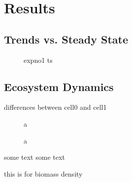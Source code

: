\chapter{Results}
\label{chap:res}


\section{Trends vs. Steady State}
\label{chap:res:dyn:trend}

\begin{figure}
\centering

\caption[Body mass density time series for experiment 1]{expno1 ts}
\label{fig:chap:res:ts:expno1}
\end{figure}

\begin{figure}
\centering

\caption[ShortCap]{}
\label{fig:chap:res:tsinit}
\end{figure}


\section{Ecosystem Dynamics}
\label{chap:res:dyn} 
differences between cell0 and cell1

\begin{figure}
\centering

\caption[Average body mass (aseasonal system)]{a}
\label{fig:chap:res:dyn:avg}
\end{figure}


\begin{figure}
\centering

\caption{a}
\label{fig:chap:res:dyn}
\end{figure}


some text some text




this is for biomass density
%


